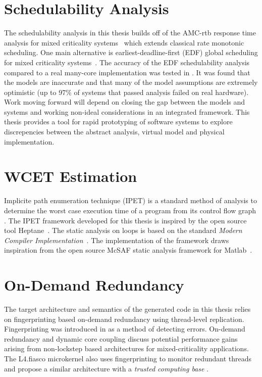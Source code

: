 \section{Schedulability Analysis}

The schedulability analysis in this thesis builds off of the AMC-rtb response time analysis for mixed criticality systems~\cite{baruah2011response} which extends classical rate monotonic scheduling. One main alternative is earliest-deadline-first (EDF) global scheduling for mixed criticality systems~\cite{kim2013novel}. The accuracy of the EDF schedulability analysis compared to a real many-core implementation was tested in \cite{sigrist2015mixed}. It was found that the models are inaccurate and that many of the model assumptions are extremely optimistic (up to 97\% of systems that passed analysis failed on real hardware). Work moving forward will depend on closing the gap between the models and systems and working non-ideal considerations in an integrated framework. This thesis provides a tool for rapid prototyping of software systems to explore discrepencies between the abstract analysis, virtual model and physical implementation.


\section{WCET Estimation}

	Implicite path enumeration technique (IPET) is a standard method of analysis to determine the worst case execution time of a program from its control flow graph \cite{li1995performance}. 
	The IPET framework developed for this thesis is inspired by the open source tool Heptane~\cite{heptane}. 
	The static analysis on loops is based on the standard \emph{Modern Compiler Implementation}~\cite{andrew2002modern}. 
	The implementation of the framework draws inspiration from the open source McSAF static analysis framework for Matlab~\cite{mcsaf}.

\section{On-Demand Redundancy}
	The target architecture and semantics of the generated code in this thesis relies on fingerprinting based on-demand redundancy using thread-level replication.
 	Fingerprinting was introduced in \cite{Smolens:04} as a method of detecting errors. 
 	On-demand redundancy \cite{Meyer:CASES11,fu2013demand} and dynamic core coupling \cite{lafrieda2007utilizing} discuss potential performance gains arising from non-lockstep based architectures for mixed-criticality applications.  
 	The L4.fiasco microkernel also uses fingerprinting to monitor redundant threads \cite{dobel2012operating} and propose a similar architecture with a \emph{trusted computing base} \cite{dobel2012watches}. 

